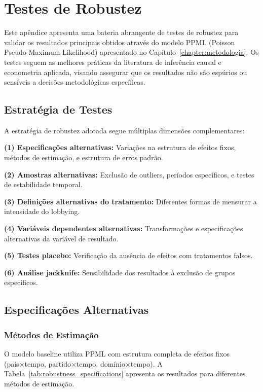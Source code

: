\chapter{Testes de Robustez}
\label{appendix:robustness}

Este apêndice apresenta uma bateria abrangente de testes de robustez para validar os resultados principais obtidos através do modelo PPML (Poisson Pseudo-Maximum Likelihood) apresentado no Capítulo~\ref{chapter:metodologia}. Os testes seguem as melhores práticas da literatura de inferência causal e econometria aplicada, visando assegurar que os resultados não são espúrios ou sensíveis a decisões metodológicas específicas.

\section{Estratégia de Testes}

A estratégia de robustez adotada segue múltiplas dimensões complementares:

\textbf{(1) Especificações alternativas:} Variações na estrutura de efeitos fixos, métodos de estimação, e estrutura de erros padrão.

\textbf{(2) Amostras alternativas:} Exclusão de outliers, períodos específicos, e testes de estabilidade temporal.

\textbf{(3) Definições alternativas do tratamento:} Diferentes formas de mensurar a intensidade do lobbying.

\textbf{(4) Variáveis dependentes alternativas:} Transformações e especificações alternativas da variável de resultado.

\textbf{(5) Testes placebo:} Verificação da ausência de efeitos com tratamentos falsos.

\textbf{(6) Análise jackknife:} Sensibilidade dos resultados à exclusão de grupos específicos.

\section{Especificações Alternativas}

\subsection{Métodos de Estimação}

O modelo baseline utiliza PPML com estrutura completa de efeitos fixos (país×tempo, partido×tempo, domínio×tempo). A Tabela~\ref{tab:robustness_specifications} apresenta os resultados para diferentes métodos de estimação.

